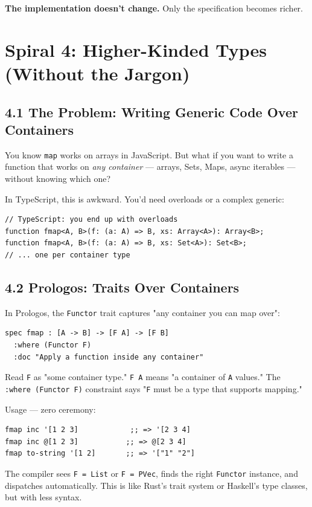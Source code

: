 \documentclass[11pt]{article}
\begin{document}
\textbf{The implementation doesn't change.} Only the specification becomes richer.
\section{Spiral 4: Higher-Kinded Types (Without the Jargon)}
\label{sec:orgbd77094}

\subsection{4.1 The Problem: Writing Generic Code Over Containers}
\label{sec:org3ee614a}

You know \texttt{map} works on arrays in JavaScript. But what if you want to
write a function that works on \emph{any container} --- arrays, Sets, Maps,
async iterables --- without knowing which one?

In TypeScript, this is awkward. You'd need overloads or a complex generic:

\begin{verbatim}
// TypeScript: you end up with overloads
function fmap<A, B>(f: (a: A) => B, xs: Array<A>): Array<B>;
function fmap<A, B>(f: (a: A) => B, xs: Set<A>): Set<B>;
// ... one per container type
\end{verbatim}
\subsection{4.2 Prologos: Traits Over Containers}
\label{sec:orgda08be5}

In Prologos, the \texttt{Functor} trait captures "any container you can map over":

\begin{verbatim}
spec fmap : [A -> B] -> [F A] -> [F B]
  :where (Functor F)
  :doc "Apply a function inside any container"
\end{verbatim}

Read \texttt{F} as "some container type." \texttt{F A} means "a container of \texttt{A} values."
The \texttt{:where (Functor F)} constraint says "\texttt{F} must be a type that supports
mapping."

Usage --- zero ceremony:

\begin{verbatim}
fmap inc '[1 2 3]            ;; => '[2 3 4]
fmap inc @[1 2 3]           ;; => @[2 3 4]
fmap to-string '[1 2]       ;; => '["1" "2"]
\end{verbatim}

The compiler sees \texttt{F = List} or \texttt{F = PVec}, finds the right \texttt{Functor}
instance, and dispatches automatically. This is like Rust's trait system
or Haskell's type classes, but with less syntax.
\end{document}

